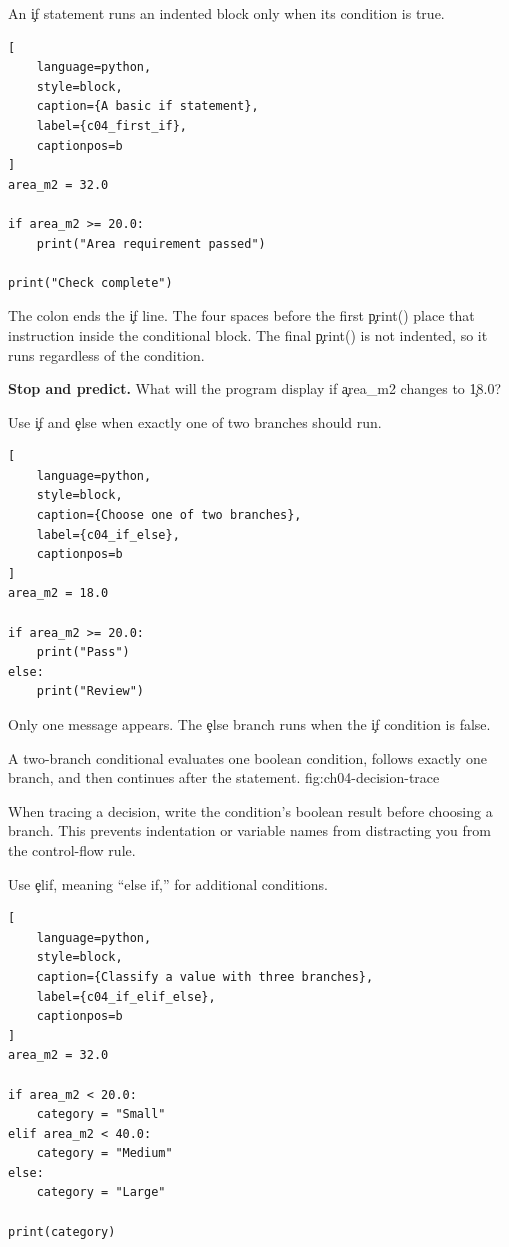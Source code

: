 
An \c{if} statement runs an indented block only when its condition is true.

\begin{lstlisting}[
    language=python,
    style=block,
    caption={A basic if statement},
    label={c04_first_if},
    captionpos=b
]
area_m2 = 32.0

if area_m2 >= 20.0:
    print("Area requirement passed")

print("Check complete")
\end{lstlisting}

The colon ends the \c{if} line. The four spaces before the first \c{print()}
place that instruction inside the conditional block. The final \c{print()} is
not indented, so it runs regardless of the condition.

\begin{NoteBox}
\textbf{Stop and predict.} What will the program display if \c{area_m2} changes
to \c{18.0}?
\end{NoteBox}


Use \c{if} and \c{else} when exactly one of two branches should run.

\begin{lstlisting}[
    language=python,
    style=block,
    caption={Choose one of two branches},
    label={c04_if_else},
    captionpos=b
]
area_m2 = 18.0

if area_m2 >= 20.0:
    print("Pass")
else:
    print("Review")
\end{lstlisting}

Only one message appears. The \c{else} branch runs when the \c{if} condition is
false.

{A two-branch conditional evaluates one boolean condition, follows exactly one branch, and then continues after the statement.}
{fig:ch04-decision-trace}

When tracing a decision, write the condition's boolean result before choosing
a branch. This prevents indentation or variable names from distracting you
from the control-flow rule.


Use \c{elif}, meaning ``else if,'' for additional conditions.

\begin{lstlisting}[
    language=python,
    style=block,
    caption={Classify a value with three branches},
    label={c04_if_elif_else},
    captionpos=b
]
area_m2 = 32.0

if area_m2 < 20.0:
    category = "Small"
elif area_m2 < 40.0:
    category = "Medium"
else:
    category = "Large"

print(category)
\end{lstlisting}

